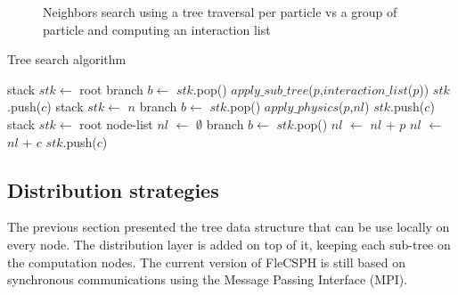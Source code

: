 \begin{figure}[ht!]
{
}
\caption{Neighbors search using a tree traversal per particle vs a group of particle and computing an interaction list}
\label{fig:arbre}
\end{figure}

\begin{algorithm}
\caption{Tree search algorithm}\label{alg:find_nodes}
\begin{algorithmic}[1]
\State stack $stk \leftarrow$ root
	\State branch $b \leftarrow$ $stk$.pop() 
			\State $apply\_sub\_tree$($p$,$interaction\_list$($p$))
		\EndFor
	\Else
			\State $stk$.push($c$)
		\EndFor
	\EndIf
\EndWhile
\EndProcedure
\State
{}
\State stack $stk \leftarrow$ $n$
	\State branch $b \leftarrow$ $stk$.pop() 
			\State $apply\_physics$($p$,$nl$)
		\EndFor
	\Else
			\State $stk$.push($c$)
		\EndFor
	\EndIf
\EndWhile
\EndProcedure
\State
{}
\State stack $stk \leftarrow$ root
\State node-list $nl$ $\leftarrow$ $\emptyset$
	\State branch $b \leftarrow$ $stk$.pop() 
				\State $nl$ $\leftarrow$ $nl$ + $p$
			\EndIf
		\EndFor
	\Else
				\State $nl$ $\leftarrow$ $nl$ + $c$
			\Else				
				\State $stk$.push($c$)
			\EndIf	
		\EndFor
	\EndIf
\EndWhile
\EndFunction
\end{algorithmic}
\end{algorithm}

\subsection{Distribution strategies}

The previous section presented the tree data structure that can be use locally on every node. 
The distribution layer is added on top of it, keeping each sub-tree on the computation nodes. 
The current version of FleCSPH is still based on synchronous communications using the Message Passing Interface (MPI). 

